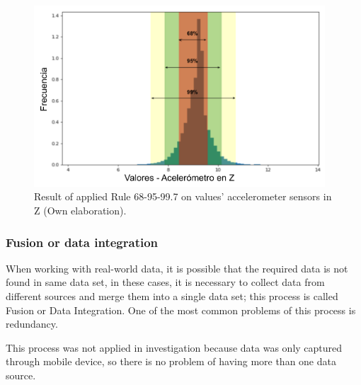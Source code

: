 \begin{figure}[h!]
  \begin{center}	\includegraphics[width=0.97\textwidth,frame]{imagenes/Cap3/68-95-99_rule_acc_z}
  \caption{Result of applied Rule 68-95-99.7 on values' accelerometer sensors in Z (Own elaboration).}
  \label{fig:689599rule_acc_z}
  \end{center}
\end{figure}

\subsubsection{Fusion or data integration}

When working with real-world data, it is possible that the required data is not found in same data set, in these cases, it is necessary to collect data from different sources and merge them into a single data set; this process is called Fusion or Data Integration. One of the most common problems of this process is redundancy.

\vspace{5mm} %

This process was not applied in investigation because data was only captured through mobile device, so there is no problem of having more than one data source.

